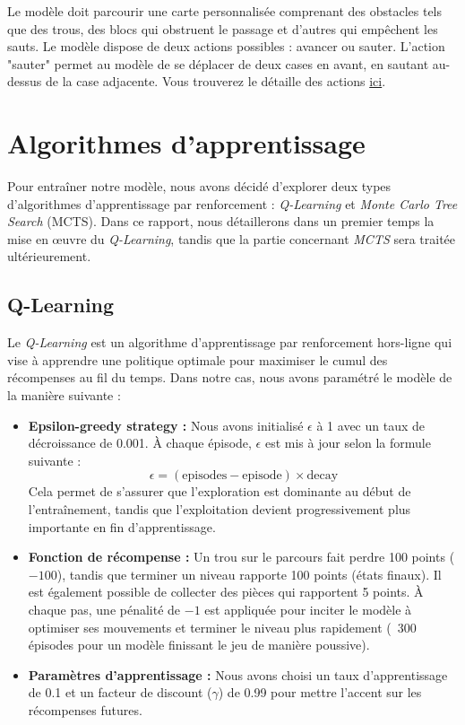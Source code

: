 \documentclass[a4paper,12pt]{article}
\begin{document}
        Le modèle doit parcourir une carte personnalisée comprenant des obstacles tels que des trous, des blocs qui obstruent le passage et d'autres qui empêchent les sauts. Le modèle dispose de deux actions possibles : avancer ou sauter. L'action "sauter" permet au modèle de se déplacer de deux cases en avant, en sautant au-dessus de la case adjacente. Vous trouverez le détaille des actions \href{https://github.com/H4znow/marioBrossGame/tree/main}{ici}.
    
    \section{Algorithmes d'apprentissage}
    
        Pour entraîner notre modèle, nous avons décidé d'explorer deux types d'algorithmes d'apprentissage par renforcement : \textit{Q-Learning} et \textit{Monte Carlo Tree Search} (MCTS). Dans ce rapport, nous détaillerons dans un premier temps la mise en œuvre du \textit{Q-Learning}, tandis que la partie concernant \textit{MCTS} sera traitée ultérieurement.
        
        \subsection{Q-Learning}
        
            Le \textit{Q-Learning} est un algorithme d'apprentissage par renforcement hors-ligne qui vise à apprendre une politique optimale pour maximiser le cumul des récompenses au fil du temps. Dans notre cas, nous avons paramétré le modèle de la manière suivante :
            
            \begin{itemize}
                \item \textbf{Epsilon-greedy strategy :} Nous avons initialisé $\epsilon$ à 1 avec un taux de décroissance de 0.001. À chaque épisode, $\epsilon$ est mis à jour selon la formule suivante : 
                \[
                \epsilon = (\text{episodes} - \text{episode}) \times \text{decay}
                \]
                Cela permet de s'assurer que l'exploration est dominante au début de l'entraînement, tandis que l'exploitation devient progressivement plus importante en fin d'apprentissage.
                
                \item \textbf{Fonction de récompense :} Un trou sur le parcours fait perdre 100 points ($-100$), tandis que terminer un niveau rapporte 100 points  (états finaux). Il est également possible de collecter des pièces qui rapportent 5 points. À chaque pas, une pénalité de $-1$ est appliquée pour inciter le modèle à optimiser ses mouvements et terminer le niveau plus rapidement (~300 épisodes pour un modèle finissant le jeu de manière poussive).
                
                \item \textbf{Paramètres d'apprentissage :} Nous avons choisi un taux d'apprentissage de 0.1 et un facteur de discount ($\gamma$) de 0.99 pour mettre l'accent sur les récompenses futures.
            \end{itemize}
\end{document}
